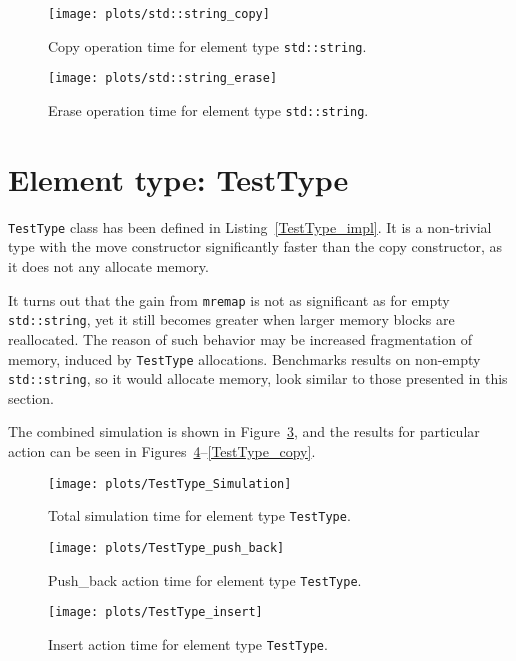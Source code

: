 \documentclass[inz, english, shortabstract]{iithesis}
\begin{document}
\begin{figure}[h!]
\texttt{[image: plots/std::string\_copy]}
\caption{Copy operation time for element type \lstinline{std::string}{}.}
\label{string_copy}
\end{figure}

\begin{figure}[h!]
\texttt{[image: plots/std::string\_erase]}
\caption{Erase operation time for element type \lstinline{std::string}{}.}
\label{string_erase}
\end{figure}

\clearpage
\section{Element type: TestType}

{\tt TestType} class has been defined in Listing~\ref{TestType_impl}.
It is a non-trivial type with the move constructor significantly faster than the copy constructor, as it does not any allocate memory.

It turns out that the gain from {\tt mremap} is not as significant as for empty {\tt std::string}, yet it still becomes greater when larger memory blocks are reallocated. The reason of such behavior may be increased fragmentation of memory, induced by {\tt TestType} allocations. Benchmarks results on non-empty {\tt std::string}, so it would allocate memory, look similar to those presented in this section.
 
The combined simulation is shown in Figure~\ref{TestType_simulation}, and the results for particular action can be seen in Figures~\ref{TestType_push_back}--\ref{TestType_copy}.

\begin{figure}[h!]
\texttt{[image: plots/TestType\_Simulation]}
\caption{Total simulation time for element type \lstinline{TestType}{}.}
\label{TestType_simulation}
\end{figure}

\begin{figure}[h!]
\texttt{[image: plots/TestType\_push\_back]}
\caption{Push\_back action time for element type \lstinline{TestType}{}.}
\label{TestType_push_back}
\end{figure}

\begin{figure}[h!]
\texttt{[image: plots/TestType\_insert]}
\caption{Insert action time for element type \lstinline{TestType}{}.}
\label{TestType_insert}
\end{figure}
\end{document}
